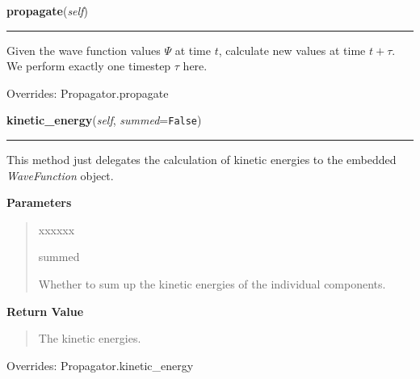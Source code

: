 \hspace{.8\funcindent}\begin{boxedminipage}{\funcwidth}

    \raggedright \textbf{propagate}(\textit{self})

    \vspace{-1.5ex}

    \rule{\textwidth}{0.5\fboxrule}
\setlength{\parskip}{2ex}
    Given the wave function values $\Psi$ at time $t$,
    calculate new values at time $t + \tau$. We perform exactly one
    timestep $\tau$ here.

\setlength{\parskip}{1ex}

      Overrides: Propagator.propagate

    \end{boxedminipage}

    \vspace{0.5ex}

\hspace{.8\funcindent}\begin{boxedminipage}{\funcwidth}

    \raggedright \textbf{kinetic\_energy}(\textit{self}, \textit{summed}={\tt False})

    \vspace{-1.5ex}

    \rule{\textwidth}{0.5\fboxrule}
\setlength{\parskip}{2ex}
    This method just delegates the calculation of kinetic energies to the
    embedded \textit{WaveFunction} object.

\setlength{\parskip}{1ex}
      \textbf{Parameters}
      \vspace{-1ex}

      \begin{quote}
        \begin{Ventry}{xxxxxx}

          \item[summed]

          Whether to sum up the kinetic energies of the individual
          components.

        \end{Ventry}

      \end{quote}

      \textbf{Return Value}
    \vspace{-1ex}

      \begin{quote}
      The kinetic energies.

      \end{quote}

      Overrides: Propagator.kinetic\_energy

    \end{boxedminipage}

